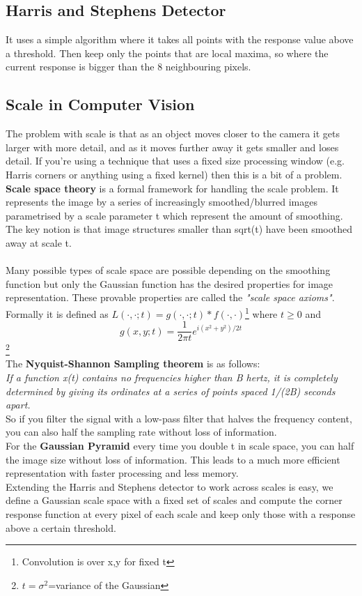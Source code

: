 \documentclass{article}
\begin{document}
	\subsection{Harris and Stephens Detector}
	It uses a simple algorithm where it takes all points with the response value above a threshold. Then keep only the points that are local maxima, so where the current response is bigger than the 8 neighbouring pixels.
	\subsection{Scale in Computer Vision}
	The problem with scale is that as an object moves closer to the camera it gets larger with more detail, and as it moves further away it gets smaller and loses detail. If you're using a technique that uses a fixed size processing window (e.g. Harris corners or anything using a fixed kernel) then this is a bit of a problem.\\
	\textbf{Scale space theory} is a formal framework for handling the scale problem. It represents the image by a series of increasingly smoothed/blurred images parametrised by a scale parameter t which represent the amount of smoothing. The key notion is that image structures smaller than sqrt(t) have been smoothed away at scale t.\\
	\\
	Many possible types of scale space are possible depending on the smoothing function but only the Gaussian function has the desired properties for image representation. These provable properties are called the \textit{"scale space axioms"}. Formally it is defined as $L(\cdot,\cdot;t)=g(\cdot,\cdot;t)*f(\cdot,\cdot)$\footnote{Convolution is over x,y for fixed t} where $t\geq0$ and
	$$g(x,y;t)=\frac{1}{2\pi t}e^{i(x^2+y^2)/2t}$$\footnote{$t=\sigma^2$=variance of the Gaussian}
	\\
	The \textbf{Nyquist-Shannon Sampling theorem} is as follows:\\
	\textit{If a function x(t) contains no frequencies higher than B hertz, it is completely determined by giving its ordinates at a series of points spaced 1/(2B) seconds apart.}\\
	So if you filter the signal with a low-pass filter that halves the frequency content, you can also half the sampling rate without loss of information.\\
	For the \textbf{Gaussian Pyramid} every time you double t in scale space, you can half the image size without loss of information. This leads to a much more efficient representation with faster processing and less memory.\\
	Extending the Harris and Stephens detector to work across scales is easy, we define a Gaussian scale space with a fixed set of scales and compute the corner response function at every pixel of each scale and keep only those with a response above a certain threshold.
\end{document}
